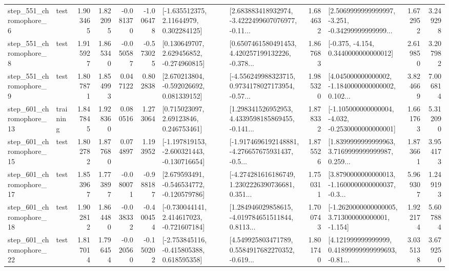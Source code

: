 \begin{tabular}{llrrrrllrlrr}
   step\_551\_chromophore\_6 &      test &      1.903465 &    1.822095 &     -0.081370 & -1.006478 &     [-1.635512375, 2.11644979, 0.302284125] &  [2.683883418932974, -3.4222499607076977, -0.11... &       1.684632 &  [2.5069999999999997, -3.251, -0.34299999999999... &            1.672952 &          3.249298 \\
   step\_551\_chromophore\_8 &      test &      1.915927 &    1.865340 &     -0.050587 & -0.573025 &    [0.130649707, 2.629456852, -0.274960815] &  [0.6507461580491453, 4.420257199132226, -0.378... &       1.867683 &               [-0.375, -4.154, 0.3440000000000012] &            2.619850 &          3.207982 \\
   step\_551\_chromophore\_9 &      test &      1.807871 &    1.854993 &      0.047122 &  0.802838 &    [2.670213804, -0.592026692, 0.081339152] &  [-4.556249988323715, 0.9734178027173954, -0.57... &       1.985320 &  [4.045000000000002, -1.1840000000000002, 0.102... &            3.824669 &          7.006814 \\
  step\_601\_chromophore\_13 &  training &      1.847845 &    1.928360 &      0.080516 &  1.273064 &      [0.715023097, 2.69123846, 0.246753461] &  [1.298341526952953, 4.4339598185869455, -0.141... &       1.878332 &  [-1.105000000000004, -4.032, -0.2530000000000001] &            1.661763 &          5.312090 \\
  step\_601\_chromophore\_15 &      test &      1.802782 &    1.877680 &      0.074897 &  1.193952 &  [-1.197819153, -2.600321443, -0.130716654] &  [-1.9174696192148881, -4.276657675931437, -0.5... &       1.875526 &  [1.8399999999999963, 3.7169999999999987, 0.259... &            1.873661 &          3.954173 \\
  step\_601\_chromophore\_17 &      test &      1.853967 &    1.773897 &     -0.080071 & -0.988187 &   [2.679593491, -0.546534772, -0.120579786] &  [-4.274281616186749, 1.2302226390736681, 0.351... &       1.750311 &  [3.8790000000000013, -1.1600000000000037, -0.3... &            5.969307 &          1.249193 \\
  step\_601\_chromophore\_18 &      test &      1.902812 &    1.864480 &     -0.038332 & -0.400454 &   [-0.730044141, 2.414617023, -0.721607184] &  [1.284946029858615, -4.019784651511844, 0.8113... &       1.700743 &   [-1.2620000000000005, 3.713000000000001, -1.154] &            1.922174 &          5.607884 \\
  step\_601\_chromophore\_22 &      test &      1.817014 &    1.796454 &     -0.020560 & -0.150202 &   [-2.753845116, -0.415805388, 0.618595358] &  [4.549925803471789, 0.5584917682270352, -0.619... &       1.801740 &  [4.121999999999999, 0.41899999999999693, -0.81... &            3.035138 &          3.679250 \\

\end{tabular}
